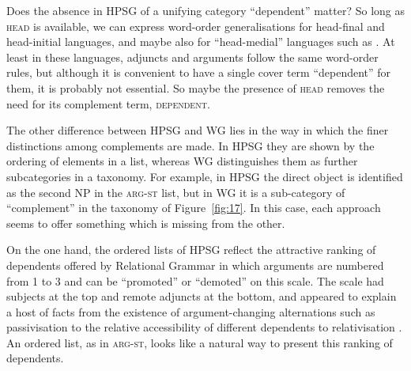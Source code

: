 \documentclass[output=paper,biblatex,babelshorthands,newtxmath,draftmode,colorlinks,citecolor=brown]{langscibook}
\begin{document}
Does the absence in HPSG of a unifying category ``dependent'' matter? So long as \textsc{head} is
available, we can express word-order generalisations for head-final and head-initial languages, and
maybe also for ``head-medial'' languages such as  \citep[172]{Hudson2010b-u}. At least
in these languages, adjuncts and arguments follow the same word-order rules, but although it is
convenient to have a single cover term ``dependent'' for them, it is probably not essential. So
maybe the presence of \textsc{head} removes the need for its complement term, \textsc{dependent}.

The other difference between HPSG and WG lies in the way in which the finer distinctions among
complements are made. In HPSG they are shown by the ordering of elements in a list, whereas WG
distinguishes them as further subcategories in a taxonomy. For example, in HPSG the direct object is
identified as the second NP in the \textsc{arg-st} list, but in WG it is a sub-category of
``complement'' in the taxonomy of Figure~\ref{fig:17}. In this case, each approach seems to offer
something which is missing from the other.

On the one hand, the ordered lists of HPSG reflect the attractive ranking of dependents offered by
Relational Grammar \citep{PP83a-u,Blake1990} in which arguments are numbered from 1 to 3 and can be
``promoted'' or ``demoted'' on this scale. The scale had subjects at the top and remote adjuncts at
the bottom, and appeared to explain a host of facts from the existence of argument-changing
alternations such as passivisation \citep{Levin93a-u} to the relative accessibility of different
dependents to relativisation \citep{KC77a}. An ordered list, as in \textsc{arg-st}, looks like a
natural way to present this ranking of dependents.
\end{document}
